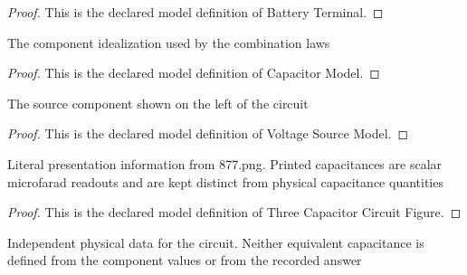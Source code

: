 \begin{proof}
  This is the declared model definition of Battery Terminal.
\end{proof}
\begin{definition}
  \label{def:physics:phyx-mini-0877:phyxminiproblems-problemphyxmini0877-capacitormodel}
  The component idealization used by the combination laws
\end{definition}
\begin{proof}
  This is the declared model definition of Capacitor Model.
\end{proof}
\begin{definition}
  \label{def:physics:phyx-mini-0877:phyxminiproblems-problemphyxmini0877-voltagesourcemodel}
  The source component shown on the left of the circuit
\end{definition}
\begin{proof}
  This is the declared model definition of Voltage Source Model.
\end{proof}
\begin{definition}
  \label{def:physics:phyx-mini-0877:phyxminiproblems-problemphyxmini0877-threecapacitorcircuitfigure}
  Literal presentation information from 877.png. Printed capacitances are scalar microfarad readouts and are kept distinct from physical capacitance quantities
\end{definition}
\begin{proof}
  This is the declared model definition of Three Capacitor Circuit Figure.
\end{proof}
\begin{definition}
  \label{def:physics:phyx-mini-0877:phyxminiproblems-problemphyxmini0877-threecapacitorcircuitsetup}
  Independent physical data for the circuit. Neither equivalent capacitance is defined from the component values or from the recorded answer
\end{definition}
